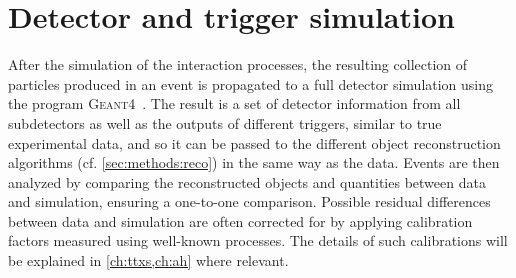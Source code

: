 \section{Detector and trigger simulation}
\label{sec:mc:detector}

After the simulation of the interaction processes, the resulting collection of particles produced in an event is propagated to a full detector simulation using the program \textsc{Geant4}~\cite{GEANT4:2002}. 
The result is a set of detector information from all subdetectors as well as the outputs of different triggers, similar to true experimental data, and so it can be passed to the different object reconstruction algorithms (cf. \cref{sec:methods:reco}) in the same way as the data. Events are then analyzed by comparing the reconstructed objects and quantities between data and simulation, ensuring a one-to-one comparison. Possible residual differences between data and simulation are often corrected for by applying calibration factors measured using well-known processes. The details of such calibrations will be explained in \cref{ch:ttxs,ch:ah} where relevant.
